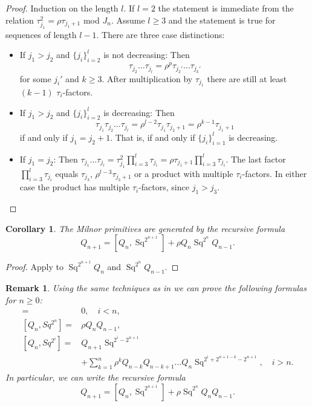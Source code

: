 \documentclass[11pt,hyp]{nyjm}
\newcommand{\Sq}{\operatorname{Sq}}
\theoremstyle{theoremstyle}
\newtheorem{corollary}[theorem]{Corollary}
\newtheorem{remark}[theorem]{Remark}
\theoremstyle{definition}
\theoremstyle{theoremstyle}
\begin{document}
\begin{proof}
  Induction on the length $l$.
  If $l = 2$ the statement is immediate from the relation $\tau_{j_1}^2 = \rho \tau_{j_1+1}$ mod $J_n$.
  Assume $l \geq 3$ and the statement is true for sequences of length $l-1$.
  There are three case distinctions:
  \begin{itemize}
  \item If $j_1 > j_2$ and $\{j_i\}_{i=2}^{l}$ is not decreasing:
    Then
    \[\tau_{j_2} \dots \tau_{j_l} = \rho^p\tau_{j_2'}\dots\tau_{j_k'}\] for some $j_i'$ and $k \geq 3$.
    After multiplication by $\tau_{j_1}$ there are still at least $(k-1)$ $\tau_i$-factors.
  \item If $j_1 > j_2$ and $\{j_i\}_{i=2}^{l}$ is decreasing:
    Then \[\tau_{j_1}\tau_{j_2} \dots \tau_{j_l} = \rho^{l-2}\tau_{j_1}\tau_{j_2+1} = \rho^{k-1}\tau_{j_1 + 1}\]
    if and only if $j_1 = j_2 + 1$.
    That is, if and only if $\{j_i\}_{i=1}^{l}$ is decreasing.
  \item If $j_1 = j_2$:
    Then $\tau_{j_1} \dots \tau_{j_l} = \tau_{j_1}^2 \prod_{i=3}^l \tau_{j_i} = \rho \tau_{j_1+1}\prod_{i=3}^l \tau_{j_i}$.
    The last factor $\prod_{i=3}^l \tau_{j_i}$ equals $\tau_{j_3}$,
    $\rho^{l-3}\tau_{j_3+1}$ or a product with multiple $\tau_i$-factors.
    In either case the product has multiple $\tau_i$-factors, since $j_1 > j_3$.
  \end{itemize}
\end{proof}
\begin{corollary}
  The Milnor primitives are generated by the recursive formula
  \[
  Q_{n+1} = [Q_n, \Sq^{2^{n+1}}] + \rho Q_n \Sq^{2^n} Q_{n-1}.
  \]
\end{corollary}
\begin{proof}
  Apply  to $\Sq^{2^{n+1}}Q_n$ and $\Sq^{2^n}Q_{n-1}$.
\end{proof}
\begin{remark}
  Using the same techniques as in  we can prove the following formulas for $n \geq 0$:
  \begin{align*}
    [Q_n, Sq^{2^i}] =& 0,\quad  i < n, \\
    [Q_n, Sq^{2^n}] =& \rho Q_n Q_{n-1}, \\
    [Q_n, Sq^{2^{i}}] =& Q_{n+1}\Sq^{2^i-2^{n+1}} \\
    &+ \sum_{k=1}^n \rho^{k} Q_{n-k}Q_{n-k+1}\dots Q_{n} \Sq^{2^{i} + 2^{n+1 - k} - 2^{n+1}}, \quad i > n.
  \end{align*}
  In particular, we can write the recursive formula
  \[
  Q_{n + 1} = [Q_n, \Sq^{2^{n+1}}] + \rho \Sq^{2^{n}}Q_n Q_{n-1}.
  \]
\end{remark}
\end{document}
